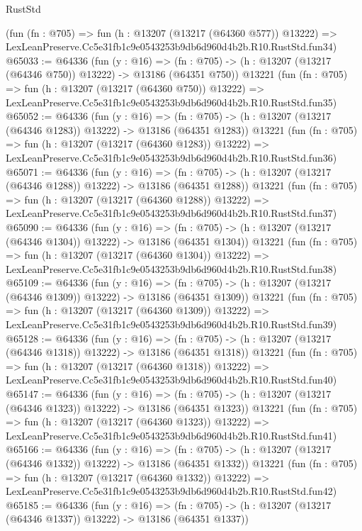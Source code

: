 \begin{lexlean}{RustStd}
\begin{coremodule}
    (fun (fn : @705) =>
    fun (h : @13207 (@13217 (@64360 @577)) @13222) =>
    LexLeanPreserve.Cc5e31fb1c9e0543253b9db6d960d4b2b.R10.RustStd.fun34)
@65033 := @64336
    (fun (y : @16) =>
    (fn : @705) -> (h : @13207 (@13217 (@64346 @750)) @13222) -> @13186 (@64351 @750))
    @13221
    (fun (fn : @705) =>
    fun (h : @13207 (@13217 (@64360 @750)) @13222) =>
    LexLeanPreserve.Cc5e31fb1c9e0543253b9db6d960d4b2b.R10.RustStd.fun35)
@65052 := @64336
    (fun (y : @16) =>
    (fn : @705) -> (h : @13207 (@13217 (@64346 @1283)) @13222) -> @13186 (@64351 @1283))
    @13221
    (fun (fn : @705) =>
    fun (h : @13207 (@13217 (@64360 @1283)) @13222) =>
    LexLeanPreserve.Cc5e31fb1c9e0543253b9db6d960d4b2b.R10.RustStd.fun36)
@65071 := @64336
    (fun (y : @16) =>
    (fn : @705) -> (h : @13207 (@13217 (@64346 @1288)) @13222) -> @13186 (@64351 @1288))
    @13221
    (fun (fn : @705) =>
    fun (h : @13207 (@13217 (@64360 @1288)) @13222) =>
    LexLeanPreserve.Cc5e31fb1c9e0543253b9db6d960d4b2b.R10.RustStd.fun37)
@65090 := @64336
    (fun (y : @16) =>
    (fn : @705) -> (h : @13207 (@13217 (@64346 @1304)) @13222) -> @13186 (@64351 @1304))
    @13221
    (fun (fn : @705) =>
    fun (h : @13207 (@13217 (@64360 @1304)) @13222) =>
    LexLeanPreserve.Cc5e31fb1c9e0543253b9db6d960d4b2b.R10.RustStd.fun38)
@65109 := @64336
    (fun (y : @16) =>
    (fn : @705) -> (h : @13207 (@13217 (@64346 @1309)) @13222) -> @13186 (@64351 @1309))
    @13221
    (fun (fn : @705) =>
    fun (h : @13207 (@13217 (@64360 @1309)) @13222) =>
    LexLeanPreserve.Cc5e31fb1c9e0543253b9db6d960d4b2b.R10.RustStd.fun39)
@65128 := @64336
    (fun (y : @16) =>
    (fn : @705) -> (h : @13207 (@13217 (@64346 @1318)) @13222) -> @13186 (@64351 @1318))
    @13221
    (fun (fn : @705) =>
    fun (h : @13207 (@13217 (@64360 @1318)) @13222) =>
    LexLeanPreserve.Cc5e31fb1c9e0543253b9db6d960d4b2b.R10.RustStd.fun40)
@65147 := @64336
    (fun (y : @16) =>
    (fn : @705) -> (h : @13207 (@13217 (@64346 @1323)) @13222) -> @13186 (@64351 @1323))
    @13221
    (fun (fn : @705) =>
    fun (h : @13207 (@13217 (@64360 @1323)) @13222) =>
    LexLeanPreserve.Cc5e31fb1c9e0543253b9db6d960d4b2b.R10.RustStd.fun41)
@65166 := @64336
    (fun (y : @16) =>
    (fn : @705) -> (h : @13207 (@13217 (@64346 @1332)) @13222) -> @13186 (@64351 @1332))
    @13221
    (fun (fn : @705) =>
    fun (h : @13207 (@13217 (@64360 @1332)) @13222) =>
    LexLeanPreserve.Cc5e31fb1c9e0543253b9db6d960d4b2b.R10.RustStd.fun42)
@65185 := @64336
    (fun (y : @16) =>
    (fn : @705) -> (h : @13207 (@13217 (@64346 @1337)) @13222) -> @13186 (@64351 @1337))

\end{coremodule}
\end{lexlean}

